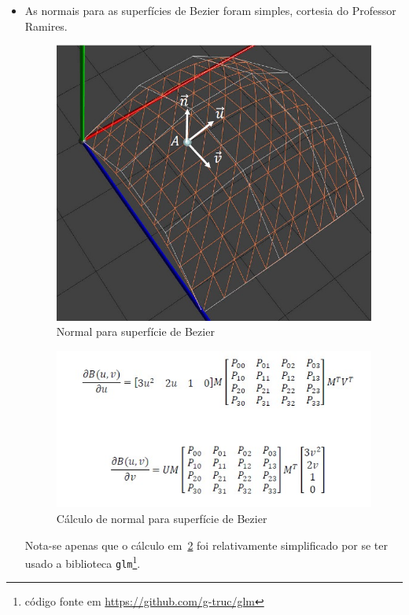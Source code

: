 \documentclass[11pt,a4paper]{report}%
\begin{document}
\begin{itemize}
  \item As normais para as superfícies de Bezier foram simples, cortesia do Professor Ramires.

  \begin{figure}[H]
    \centering
    \includegraphics[scale=0.5]{bezier_normal.jpg}
    \caption{Normal para superfície de Bezier}
    \label{fig:bezier_normal}
  \end{figure}

  \begin{figure}[H]
    \centering
    \includegraphics[scale=1]{bezier_normal_2.jpg}
    \caption{Cálculo de normal para superfície de Bezier}
    \label{fig:bezier_normal_2}
  \end{figure}

  Nota-se apenas que o cálculo em~\ref{fig:bezier_normal_2} foi relativamente simplificado por se ter usado a
  biblioteca \texttt{glm}\footnote{código fonte em \url{https://github.com/g-truc/glm}}.


\end{itemize}
\end{document}

